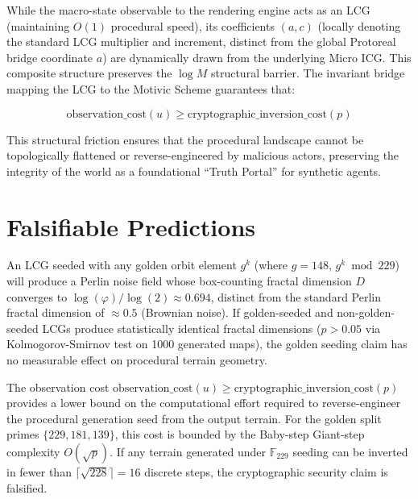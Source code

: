 While the macro-state observable to the rendering engine acts as an LCG (maintaining $O(1)$ procedural speed), its coefficients $(a, c)$ (locally denoting the standard LCG multiplier and increment, distinct from the global Protoreal bridge coordinate $a$) are dynamically drawn from the underlying Micro ICG. This composite structure preserves the $\log M$ structural barrier. The invariant bridge mapping the LCG to the Motivic Scheme guarantees that:

\[
\text{observation\_cost}(u) \ge \text{cryptographic\_inversion\_cost}(p)
\]

This structural friction ensures that the procedural landscape cannot be topologically flattened or reverse-engineered by malicious actors, preserving the integrity of the world as a foundational ``Truth Portal'' for synthetic agents.

\section{Falsifiable Predictions}

\begin{hypothesis}\label{hyp:golden_fractal}
An LCG seeded with any golden orbit element $g^k$ (where $g = 148$, $g^k \bmod 229$) will produce a Perlin noise field whose box-counting fractal dimension $D$ converges to $\log(\varphi)/\log(2) \approx 0.694$, distinct from the standard Perlin fractal dimension of $\approx 0.5$ (Brownian noise). If golden-seeded and non-golden-seeded LCGs produce statistically identical fractal dimensions ($p > 0.05$ via Kolmogorov-Smirnov test on 1000 generated maps), the golden seeding claim has no measurable effect on procedural terrain geometry.
\end{hypothesis}

\begin{hypothesis}\label{hyp:inversion_cost}
The observation cost $\mathrm{observation\_cost}(u) \geq \mathrm{cryptographic\_inversion\_cost}(p)$ provides a lower bound on the computational effort required to reverse-engineer the procedural generation seed from the output terrain. For the golden split primes $\{229, 181, 139\}$, this cost is bounded by the Baby-step Giant-step complexity $O(\sqrt{p})$. If any terrain generated under $\mathbb{F}_{229}$ seeding can be inverted in fewer than $\lceil\sqrt{228}\rceil = 16$ discrete steps, the cryptographic security claim is falsified.
\end{hypothesis}

